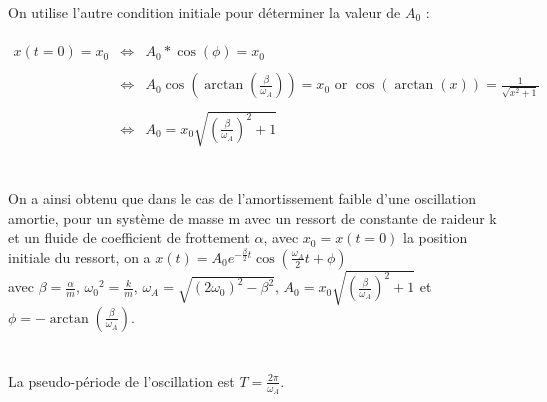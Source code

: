 \documentclass[a4paper,10pt]{book}
\begin{document}
On utilise l'autre condition initiale pour déterminer la valeur de $A_{0}$ :\\\\
$\begin{array}{rcl} x(t=0)=x_{0} &\Leftrightarrow &A_{0}*\cos(\phi)=x_{0}\\\\
&\Leftrightarrow &A_{0}\cos(\arctan(\frac{\beta}{\omega_{A}}))=x_{0} \text{ or }\cos(\arctan(x))=\frac{1}{\sqrt{x^{2}+1}} \\\\
&\Leftrightarrow &A_{0}=x_{0}\sqrt{(\frac{\beta}{\omega_{A}})^{2}+1}\end{array}$\\\\\\

On a ainsi obtenu que dans le cas de l'amortissement faible d'une oscillation amortie, pour un système de masse m avec un ressort de constante de raideur k et un fluide de coefficient de frottement $\alpha$, avec $x_{0}=x(t=0)$ la position initiale du ressort, on a $x(t)=A_{0}e^{-\frac{\beta}{2}t}\cos(\frac{\omega_{A}}{2}t+\phi)$\\
avec $\beta=\frac{\alpha}{m}$, $\omega_{0}{}^{2}=\frac{k}{m}$, $\omega_{A}=\sqrt{(2\omega_{0})^{2}-\beta^{2}}$, $A_{0}=x_{0}\sqrt{(\frac{\beta}{\omega_{A}})^{2}+1}$ et $\phi=-\arctan(\frac{\beta}{\omega_{A}})$.\\\\\\

La pseudo-période de l'oscillation est $T=\frac{2\pi}{\omega_{A}}$.\\

\begin{center}  \end{center}

\newpage
\end{document}
